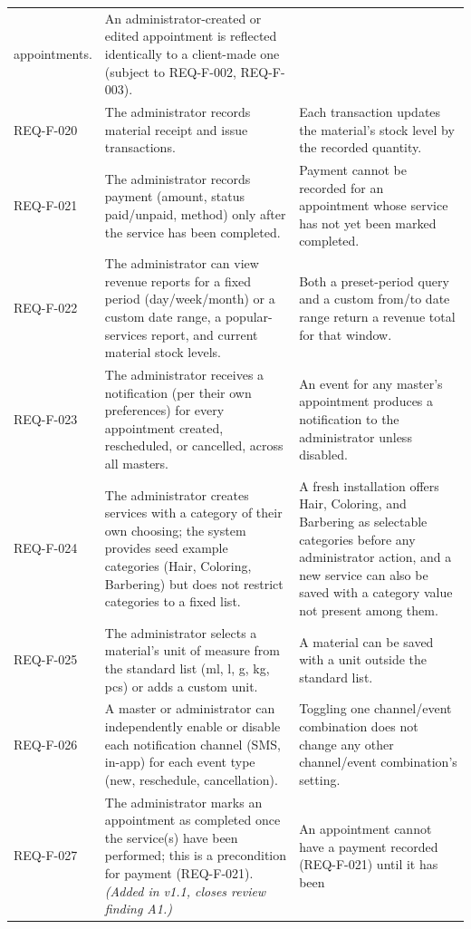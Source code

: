 \documentclass[11pt,a4paper]{article}
\begin{document}
\begin{longtable}{L{1.9cm}L{6.4cm}L{6.2cm}}
  appointments. & An administrator-created or edited appointment is
  reflected identically to a client-made one (subject to REQ-F-002,
  REQ-F-003). \\
REQ-F-020 & The administrator records material receipt and issue
  transactions. & Each transaction updates the material's stock level by
  the recorded quantity. \\
REQ-F-021 & The administrator records payment (amount, status paid/unpaid,
  method) only after the service has been completed. & Payment cannot be
  recorded for an appointment whose service has not yet been marked
  completed. \\
REQ-F-022 & The administrator can view revenue reports for a fixed period
  (day/week/month) or a custom date range, a popular-services report, and
  current material stock levels. & Both a preset-period query and a custom
  from/to date range return a revenue total for that window. \\
REQ-F-023 & The administrator receives a notification (per their own
  preferences) for every appointment created, rescheduled, or cancelled,
  across all masters. & An event for any master's appointment produces a
  notification to the administrator unless disabled. \\
REQ-F-024 & The administrator creates services with a category of their own
  choosing; the system provides seed example categories (Hair, Coloring,
  Barbering) but does not restrict categories to a fixed list. & A fresh
  installation offers Hair, Coloring, and Barbering as selectable
  categories before any administrator action, and a new service can also
  be saved with a category value not present among them. \\
REQ-F-025 & The administrator selects a material's unit of measure from the
  standard list (ml, l, g, kg, pcs) or adds a custom unit. & A material can
  be saved with a unit outside the standard list. \\
REQ-F-026 & A master or administrator can independently enable or disable
  each notification channel (SMS, in-app) for each event type (new,
  reschedule, cancellation). & Toggling one channel/event combination does
  not change any other channel/event combination's setting. \\
REQ-F-027 & The administrator marks an appointment as completed once the
  service(s) have been performed; this is a precondition for payment
  (REQ-F-021). \emph{(Added in v1.1, closes review finding A1.)} & An
  appointment cannot have a payment recorded (REQ-F-021) until it has been

\end{longtable}
\end{document}
